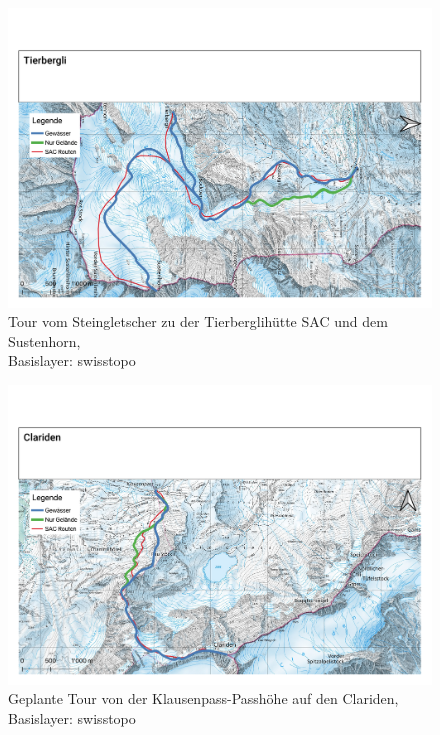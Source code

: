 \begin{Mappage}
{
  \begin{figure}[H]
    \centering
    \includegraphics[page=1,width=.9\linewidth]{./../evaluation/PDFs/Tierbergli.pdf}
    \caption{Tour vom Steingletscher zu der Tierberglihütte SAC und dem Sustenhorn, \\Basislayer: swisstopo}\label{fig:tierbergli}
    \end{figure}

  \begin{figure}[H]
    \centering
    \includegraphics[page=1,width=.9\linewidth]{./../evaluation/PDFs/Clariden.pdf}
    \caption{Geplante Tour von der Klausenpass-Passhöhe auf den Clariden, \\Basislayer: swisstopo}\label{fig:clariden}
  \end{figure}
}


\end{Mappage}
